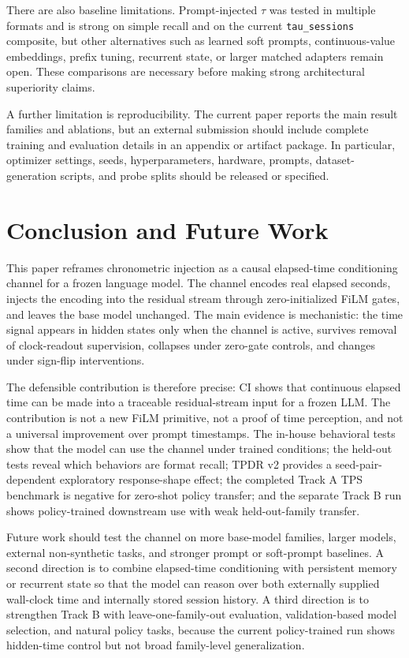 \documentclass[conference,10pt]{IEEEtran}
\newcommand{\CI}{\textsc{CI}}
\newcommand{\Tau}{\tau}
\begin{document}
There are also baseline limitations. Prompt-injected $\Tau$ was tested in multiple formats and is strong on simple recall and on the current \texttt{tau\_sessions} composite, but other alternatives such as learned soft prompts, continuous-value embeddings, prefix tuning, recurrent state, or larger matched adapters remain open. These comparisons are necessary before making strong architectural superiority claims.

A further limitation is reproducibility. The current paper reports the main result families and ablations, but an external submission should include complete training and evaluation details in an appendix or artifact package. In particular, optimizer settings, seeds, hyperparameters, hardware, prompts, dataset-generation scripts, and probe splits should be released or specified.

\section{Conclusion and Future Work}

This paper reframes chronometric injection as a causal elapsed-time conditioning channel for a frozen language model. The channel encodes real elapsed seconds, injects the encoding into the residual stream through zero-initialized FiLM gates, and leaves the base model unchanged. The main evidence is mechanistic: the time signal appears in hidden states only when the channel is active, survives removal of clock-readout supervision, collapses under zero-gate controls, and changes under sign-flip interventions.

The defensible contribution is therefore precise: \CI{} shows that continuous elapsed time can be made into a traceable residual-stream input for a frozen LLM. The contribution is not a new FiLM primitive, not a proof of time perception, and not a universal improvement over prompt timestamps. The in-house behavioral tests show that the model can use the channel under trained conditions; the held-out tests reveal which behaviors are format recall; TPDR v2 provides a seed-pair-dependent exploratory response-shape effect; the completed Track A TPS benchmark is negative for zero-shot policy transfer; and the separate Track B run shows policy-trained downstream use with weak held-out-family transfer.

Future work should test the channel on more base-model families, larger models, external non-synthetic tasks, and stronger prompt or soft-prompt baselines. A second direction is to combine elapsed-time conditioning with persistent memory or recurrent state so that the model can reason over both externally supplied wall-clock time and internally stored session history. A third direction is to strengthen Track B with leave-one-family-out evaluation, validation-based model selection, and natural policy tasks, because the current policy-trained run shows hidden-time control but not broad family-level generalization.
\end{document}
